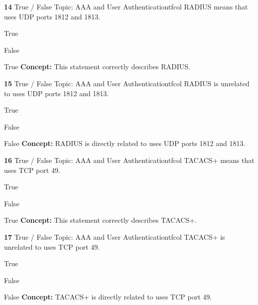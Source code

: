 \documentclass[10pt,a4paper]{article}
\begin{document}
\begin{qcard}{\color{white}\textbf{14} \hfill \small True / False \textbar{} Topic: AAA and User Authentication}{tfcol}
RADIUS means that uses UDP ports 1812 and 1813.

\begin{qoptions}
\item True
\item False
\end{qoptions}
\begin{explainbox}{True}
\textbf{Concept:} This statement correctly describes RADIUS.
\end{explainbox}
\end{qcard}

\begin{qcard}{\color{white}\textbf{15} \hfill \small True / False \textbar{} Topic: AAA and User Authentication}{tfcol}
RADIUS is unrelated to uses UDP ports 1812 and 1813.

\begin{qoptions}
\item True
\item False
\end{qoptions}
\begin{explainbox}{False}
\textbf{Concept:} RADIUS is directly related to uses UDP ports 1812 and 1813.
\end{explainbox}
\end{qcard}

\begin{qcard}{\color{white}\textbf{16} \hfill \small True / False \textbar{} Topic: AAA and User Authentication}{tfcol}
TACACS+ means that uses TCP port 49.

\begin{qoptions}
\item True
\item False
\end{qoptions}
\begin{explainbox}{True}
\textbf{Concept:} This statement correctly describes TACACS+.
\end{explainbox}
\end{qcard}

\begin{qcard}{\color{white}\textbf{17} \hfill \small True / False \textbar{} Topic: AAA and User Authentication}{tfcol}
TACACS+ is unrelated to uses TCP port 49.

\begin{qoptions}
\item True
\item False
\end{qoptions}
\begin{explainbox}{False}
\textbf{Concept:} TACACS+ is directly related to uses TCP port 49.
\end{explainbox}
\end{qcard}
\end{document}
